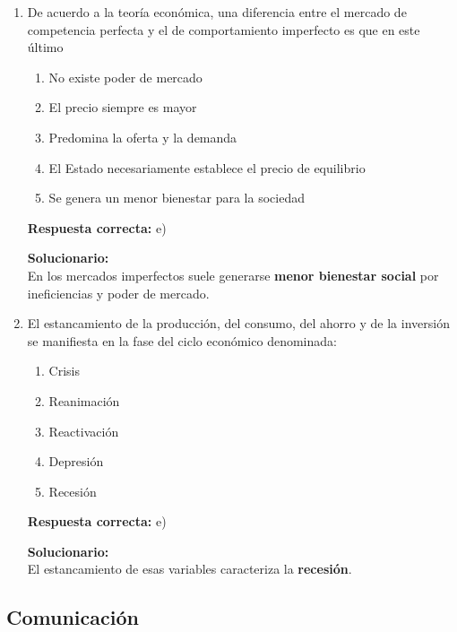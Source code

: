 \begin{enumerate}
	\vspace{6mm}
	
	\item De acuerdo a la teoría económica, una diferencia entre el mercado de competencia perfecta y el de comportamiento imperfecto es que en este último
	\begin{enumerate}[label=\alph*)]
		\item No existe poder de mercado
		\item El precio siempre es mayor
		\item Predomina la oferta y la demanda
		\item El Estado necesariamente establece el precio de equilibrio
		\item Se genera un menor bienestar para la sociedad
	\end{enumerate}
	\textbf{Respuesta correcta:} e)
	
	\vspace{2mm}
	\textbf{Solucionario:}\\
	En los mercados imperfectos suele generarse \textbf{menor bienestar social} por ineficiencias y poder de mercado.
	
	\vspace{6mm}
	
	\item El estancamiento de la producción, del consumo, del ahorro y de la inversión se manifiesta en la fase del ciclo económico denominada:
	\begin{enumerate}[label=\alph*)]
		\item Crisis
		\item Reanimación
		\item Reactivación
		\item Depresión
		\item Recesión
	\end{enumerate}
	\textbf{Respuesta correcta:} e)
	
	\vspace{2mm}
	\textbf{Solucionario:}\\
	El estancamiento de esas variables caracteriza la \textbf{recesión}.
	
	\vspace{6mm}
	
\end{enumerate}

\subsection*{Comunicación}

